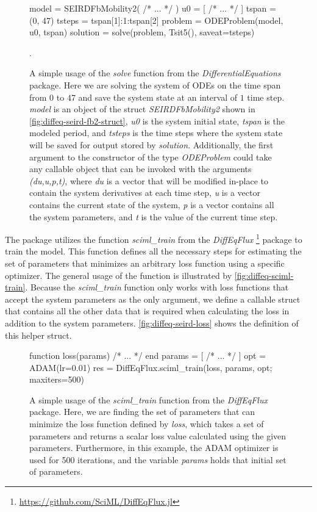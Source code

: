 \begin{figure}[!htb]
\begin{jllisting}
model = SEIRDFbMobility2( /* ... */ )
u0 = [ /* ... */ ]
tspan = (0, 47)
tsteps = tspan[1]:1:tspan[2]
problem = ODEProblem(model, u0, tspan)
solution = solve(problem, Tsit5(), saveat=tsteps)
\end{jllisting}
\caption[Solving system of ODEs with \textit{DifferentialEquations} package in Julia]{A simple usage of the \textit{solve} function from the \textit{DifferentialEquations} package. Here we are solving the system of ODEs on the time span from $0$ to $47$ and save the system state at an interval of $1$ time step. \textit{model} is an object of the struct \textit{SEIRDFbMobility2} shown in \autoref{fig:diffeq-seird-fb2-struct}, \textit{u0} is the system initial state, \textit{tspan} is the modeled period, and \textit{tsteps} is the time steps where the system state will be saved for output stored by \textit{solution}. Additionally, the first argument to the constructor of the type \textit{ODEProblem} could take any callable object that can be invoked with the arguments \textit{(du,u,p,t)}, where \textit{du} is a vector that will be modified in-place to contain the system derivatives at each time step, \textit{u} is a vector contains the current state of the system, \textit{p} is a vector contains all the system parameters, and \textit{t} is the value of the current time step.}.
\label{fig:diffeq-solve-usage}
\end{figure}

The package utilizes the function \textit{sciml\_train} from the \textit{DiffEqFlux} \footnote{\url{https://github.com/SciML/DiffEqFlux.jl}} package to train the model.
This function defines all the necessary steps for estimating the set of parameters that minimizes an arbitrary loss function using a specific optimizer.
The general usage of the function is illustrated by \autoref{fig:diffeq-sciml-train}.
Because the \textit{sciml\_train} function only works with loss functions that accept the system parameters as the only argument, we define a callable struct that contains all the other data that is required when calculating the loss in addition to the system parameters.
\autoref{fig:diffeq-seird-loss} shows the definition of this helper struct.

\begin{figure}[!htb]
\begin{jllisting}
function loss(params)
    /* ... */
end
params = [ /* ... */ ]
opt = ADAM(lr=0.01)
res = DiffEqFlux.sciml_train(loss, params, opt; maxiters=500)
\end{jllisting}
\caption[Training UDE with \textit{DiffEqFlux} package in Julia]{A simple usage of the \textit{sciml\_train} function from the \textit{DiffEqFlux} package. Here, we are finding the set of parameters that can minimize the loss function defined by \textit{loss}, which takes a set of parameters and returns a scalar loss value calculated using the given parameters. Furthermore, in this example, the ADAM optimizer is used for 500 iterations, and the variable \textit{params} holds that initial set of parameters.}
\label{fig:diffeq-sciml-train}
\end{figure}

